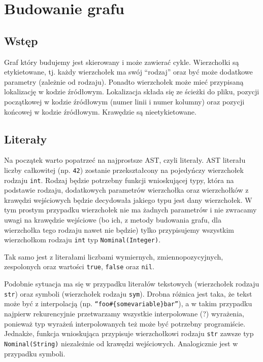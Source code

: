 \documentclass[declaration,shortabstract]{iithesis}
\begin{document}
\section{Budowanie grafu}

\subsection{Wstęp}

Graf który budujemy jest skierowany i może zawierać cykle. Wierzchołki są etykietowane, tj. każdy wierzchołek ma swój ``rodzaj'' oraz być może dodatkowe parametry (zależnie od rodzaju). Ponadto wierzchołek może mieć przypisaną lokalizację w kodzie źródłowym. Lokalizacja składa się ze ścieżki do pliku, pozycji początkowej w kodzie źródłowym (numer linii i numer kolumny) oraz pozycji końcowej w kodzie źródłowym. Krawędzie są nieetykietowane.

\subsection{Literały}

Na początek warto popatrzeć na najprostsze AST, czyli literały. AST literału liczby całkowitej (np. \texttt{42}) zostanie przekształcony na pojedyńczy wierzchołek rodzaju \texttt{int}. Rodzaj będzie potrzebny funkcji wnioskującej typy, która na podstawie rodzaju, dodatkowych parametrów wierzchołka oraz wierzchołków z krawędzi wejściowych będzie decydowała jakiego typu jest dany wierzchołek. W tym prostym przypadku wierzchołek nie ma żadnych parametrów i nie zwracamy uwagi na krawędzie wejściowe (bo ich, z metody budowania grafu, dla wierzchołka tego rodzaju nawet nie będzie) tylko przypisujemy wszystkim wierzchołkom rodzaju \texttt{int} typ \texttt{Nominal(Integer)}.

Tak samo jest z literałami liczbami wymiernych, zmiennopozycyjnych, zespolonych oraz wartości \texttt{true}, \texttt{false} oraz \texttt{nil}.

Podobnie sytuacja ma się w przypadku literałów tekstowych (wierzchołek rodzaju \texttt{str}) oraz symboli (wierzchołek rodzaju \texttt{sym}). Drobna różnica jest taka, że tekst może być z interpolacją (np. \texttt{``foo\#\{somevariable\}bar''}), a w takim przypadku najpierw rekurencyjnie przetwarzamy wszystkie interpolowane (?) wyrażenia, ponieważ typ wyrażeń interpolowanych też może być potrzebny programiście. Jednakże, funkcja wnioskująca przypisuje wierzchołkowi rodzaju \texttt{str} zawsze typ \texttt{Nominal(String)} niezależnie od krawędzi wejściowych. Analogicznie jest w przypadku symboli.
\end{document}
